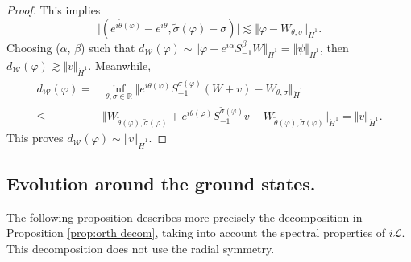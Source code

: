 \documentclass[reqno, 11pt]{amsart}
\numberwithin{equation}{section}
\newcommand{\R}{\mathbb{R}}
\theoremstyle{plain}
\theoremstyle{definition}
\numberwithin{equation}{section}
\numberwithin{theorem}{section}
\numberwithin{equation}{section}
\numberwithin{equation}{section}
\numberwithin{theorem}{section}
\begin{document}
\begin{proof}
		This implies
		\begin{equation*}
		\big|\left(e^{i\widetilde{\theta}(\varphi)}-e^{i\theta}, \widetilde{\sigma}(\varphi)-\sigma \right)\big|\lesssim \Vert \varphi-W_{\theta,\sigma}\Vert_{\dot H^1}.
		\end{equation*}
		Choosing ($\alpha$, $\beta$) such  that $d_{\mathcal{W}}(\varphi) \sim \Vert \varphi-e^{i\alpha} S_{-1}^{\beta}W \Vert_{\dot H^1}=\Vert  \psi\Vert_{\dot H^1}$, then $d_{\mathcal{W}}(\varphi)\gtrsim\Vert v\Vert_{\dot H^1}$. Meanwhile,
		\begin{equation*}
		\begin{aligned}
		d_{\mathcal{W}}(\varphi)=&\inf_{\theta,\sigma \in \R} \Vert e^{i\widetilde{\theta}(\varphi)}S_{-1}^{\widetilde{\sigma}(\varphi)}(W+v) -W_{\theta,\sigma}\Vert_{\dot H^1}\\\leq& \Vert W_{\widetilde{\theta}(\varphi),\widetilde{\sigma}(\varphi)} +e^{i\widetilde{\theta}(\varphi)}S_{-1}^{\widetilde{\sigma}(\varphi)}v -W_{\widetilde{\theta}(\varphi),\widetilde{\sigma}(\varphi)}\Vert_{\dot H^1}=\Vert v\Vert_{\dot H^1}.
		\end{aligned}
		\end{equation*}
		This proves $d_{\mathcal{W}}(\varphi)\sim \Vert v\Vert_{\dot H^1}$.
		
	\end{proof}
	
	
	
	
	\subsection{Evolution around the ground states.} The following proposition describes more precisely the decomposition in Proposition \ref{prop:orth decom}, taking into account the spectral properties of $i \mathcal{L}$. This decomposition does not use the radial symmetry.
	
\end{document}
